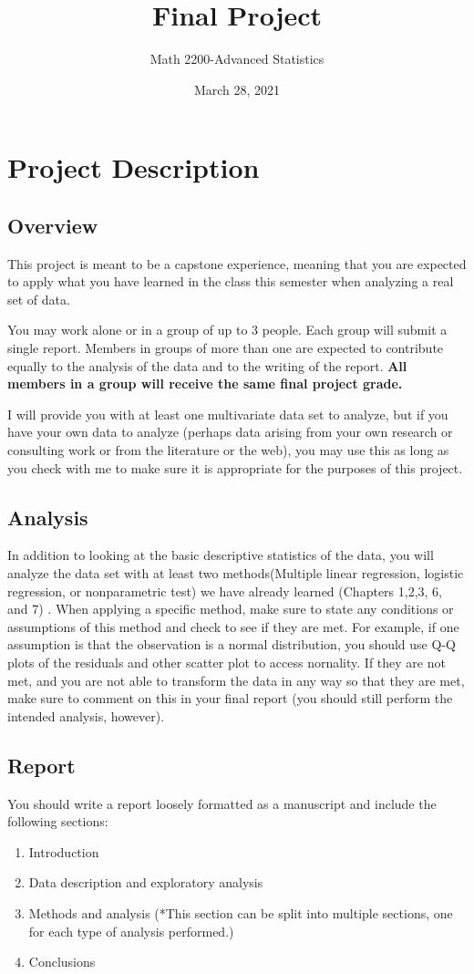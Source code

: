 \documentclass[]{article}
\title{Final Project}
\author{Math 2200-Advanced Statistics }
\date{March 28, 2021}
\begin{document}
\maketitle
\section{Project Description}
\subsection{Overview}
This project is meant to be a capstone experience, meaning that you are expected to apply what you have learned in the class this semester when analyzing a real set of data.

You may work alone or in a group of up to 3 people. Each group will submit a single report. Members in groups of more than one are expected to contribute equally to the analysis of the data and to the writing of the report. \textbf{All members in a group will receive the same final project grade.}

I will provide you with at least one multivariate data set to analyze, but if you have your own data to analyze (perhaps data arising from your own research or consulting work or from the literature or the web), you may use this as long as you check with me to make sure it is appropriate for the purposes of this project.

\subsection{Analysis}
In addition to looking at the basic descriptive statistics of the data, you will analyze the data set with at least two methods(Multiple linear regression, logistic regression, or nonparametric test) we have already learned (Chapters 1,2,3, 6, and 7) . When applying a specific method, make sure to state any conditions or assumptions of this method and check to see if they are met. For example, if one assumption is that the observation is a normal distribution, you should use Q-Q plots of the residuals and other scatter plot to access nornality. If they are not met, and you are not able to transform the data in any way so that they are met, make sure to comment on this in your final report (you should still perform the intended analysis, however).

\subsection{Report}
You should write a report loosely formatted as a manuscript and include the following sections:
\begin{enumerate}
	
	\item  Introduction
\item Data description and exploratory analysis
\item Methods and analysis (*This section can be split into multiple sections, one for
each type of analysis performed.)
\item Conclusions
	
	\end{enumerate}
	
\end{document}
